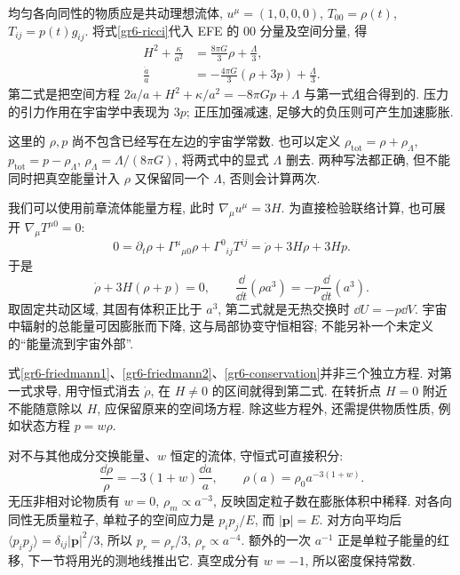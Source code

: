 均匀各向同性的物质应是共动理想流体, $u^\mu=(1,0,0,0)$, $T_{00}=\rho(t)$, $T_{ij}=p(t)g_{ij}$. 将式\eqref{gr6-ricci}代入 EFE 的 $00$ 分量及空间分量, 得
\begin{align}
 H^2+\frac\kappa{a^2}&=\frac{8\pi G}{3}\rho+\frac\Lambda3,
                                      \label{gr6-friedmann1}\\
 \frac{\ddot a}{a}&=-\frac{4\pi G}{3}(\rho+3p)+\frac\Lambda3.
                                      \label{gr6-friedmann2}
\end{align}
第二式是把空间方程 $2\ddot a/a+H^2+\kappa/a^2=-8\pi Gp+\Lambda$ 与第一式组合得到的. 压力的引力作用在宇宙学中表现为 $3p$; 正压加强减速, 足够大的负压则可产生加速膨胀.

这里的 $\rho,p$ 尚不包含已经写在左边的宇宙学常数. 也可以定义 $\rho_{\mathrm{tot}}=\rho+\rho_\Lambda$, $p_{\mathrm{tot}}=p-\rho_\Lambda$, $\rho_\Lambda=\Lambda/(8\pi G)$, 将两式中的显式 $\Lambda$ 删去. 两种写法都正确, 但不能同时把真空能量计入 $\rho$ 又保留同一个 $\Lambda$, 否则会计算两次.


我们可以使用前章流体能量方程, 此时 $\nabla_\mu u^\mu=3H$. 为直接检验联络计算, 也可展开 $\nabla_\mu T^{\mu0}=0$:
\[
 0=\partial_t\rho+\Gamma^\mu{}_{\mu0}\rho+\Gamma^0{}_{ij}T^{ij}
   =\dot\rho+3H\rho+3Hp.
\]
于是
\begin{equation}\label{gr6-conservation}
 \dot\rho+3H(\rho+p)=0,
 \qquad \frac{\dd}{\dd t}(\rho a^3)=-p\frac{\dd}{\dd t}(a^3).
\end{equation}
取固定共动区域, 其固有体积正比于 $a^3$, 第二式就是无热交换时 $\dd U=-p\dd V$. 宇宙中辐射的总能量可因膨胀而下降, 这与局部协变守恒相容; 不能另补一个未定义的“能量流到宇宙外部”.

式\eqref{gr6-friedmann1}、\eqref{gr6-friedmann2}、\eqref{gr6-conservation}并非三个独立方程. 对第一式求导, 用守恒式消去 $\dot\rho$, 在 $H\ne0$ 的区间就得到第二式. 在转折点 $H=0$ 附近不能随意除以 $H$, 应保留原来的空间场方程. 除这些方程外, 还需提供物质性质, 例如状态方程 $p=w\rho$.

对不与其他成分交换能量、$w$ 恒定的流体, 守恒式可直接积分:
\begin{equation}\label{gr6-rho-scaling}
 \frac{\dd\rho}{\rho}=-3(1+w)\frac{\dd a}{a},
 \qquad \rho(a)=\rho_0a^{-3(1+w)}.
\end{equation}
无压非相对论物质有 $w=0$, $\rho_m\propto a^{-3}$, 反映固定粒子数在膨胀体积中稀释. 对各向同性无质量粒子, 单粒子的空间应力是 $p_ip_j/E$, 而 $|\boldsymbol p|=E$. 对方向平均后 $\langle p_ip_j\rangle=\delta_{ij}|\boldsymbol p|^2/3$, 所以 $p_r=\rho_r/3$, $\rho_r\propto a^{-4}$. 额外的一次 $a^{-1}$ 正是单粒子能量的红移, 下一节将用光的测地线推出它. 真空成分有 $w=-1$, 所以密度保持常数.


